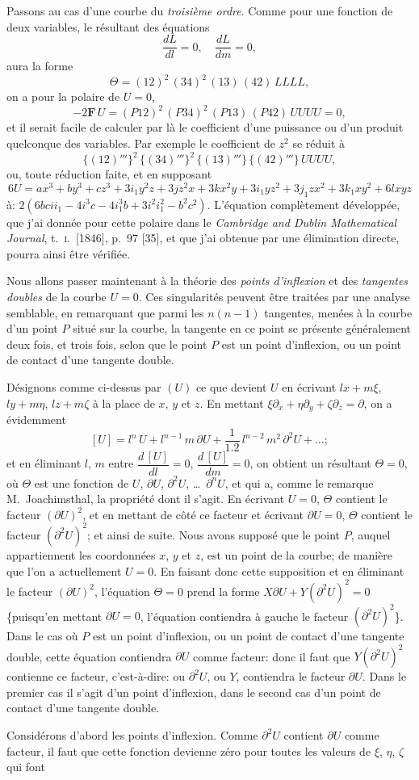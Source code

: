 \documentclass[12pt,a4paper]{article}
\theoremstyle{plain}
\begin{document}
Passons au cas d'une courbe du \textit{troisi\`eme ordre}. Comme pour une fonction de deux variables, le r\'esultant des \'equations
\[
\frac{dL}{dl} = 0, \quad \frac{dL}{dm} = 0,
\]
aura la forme
\[
\Theta = (12)^2\,(34)^2\,(13)\,(42)\, LLLL,
\]
on a pour la polaire de $U = 0$,
\[
-2\mathbf{F}\,U = (P12)^2\,(P34)^2\,(P13)\,(P42)\,UUUU = 0,
\]
et il serait facile de calculer par l\`a le coefficient d'une puissance ou d'un produit quelconque des variables. Par exemple le coefficient de $z^2$ se r\'eduit \`a
\[
\{(12)'''\}^2\,\{(34)'''\}^2\,\{(13)'''\}\,\{(42)'''\}\,UUUU,
\]
ou, toute r\'eduction faite, et en supposant
\[
6U = ax^3 + by^3 + cz^3 + 3i_1 y^2z + 3jz^2x + 3kx^2y + 3i_1 yz^2 + 3j_1 zx^2 + 3k_1 xy^2 + 6lxyz
\]
\`a: $2(6bcii_1 - 4i^3c - 4i_1^3b + 3i^2i_1^2 - b^2c^2)$. L'\'equation compl\`etement d\'evelopp\'ee, que j'ai donn\'ee pour cette polaire dans le \textit{Cambridge and Dublin Mathematical Journal}, t.~\textsc{i}.~[1846], p.~97 [35], et que j'ai obtenue par une \'elimination directe, pourra ainsi \^etre v\'erifi\'ee.

Nous allons passer maintenant \`a la th\'eorie des \textit{points d'inflexion} et des \textit{tangentes doubles} de la courbe $U = 0$. Ces singularit\'es peuvent \^etre trait\'ees par une analyse semblable, en remarquant que parmi les $n(n-1)$ tangentes, men\'ees \`a la courbe d'un point $P$ situ\'e sur la courbe, la tangente en ce point se pr\'esente g\'en\'eralement deux fois, et trois fois, selon que le point $P$ est un point d'inflexion, ou un point de contact d'une tangente double.

D\'esignons comme ci-dessus par $(U)$ ce que devient $U$ en \'ecrivant $lx + m\xi$, $ly + m\eta$, $lz + m\zeta$ \`a la place de $x$, $y$ et $z$. En mettant $\xi\partial_x + \eta\partial_y + \zeta\partial_z = \partial$, on a \'evidemment
\[
[U] = l^n\,U + l^{n-1}\,m\,\partial U + \frac{1}{1.2}\,l^{n-2}\,m^2\,\partial^2 U + \ldots;
\]
et en \'eliminant $l$, $m$ entre $\dfrac{d\,[U]}{dl} = 0$, $\dfrac{d\,[U]}{dm} = 0$, on obtient un r\'esultant $\Theta = 0$, o\`u $\Theta$ est une fonction de $U$, $\partial U$, $\partial^2 U$, \ldots\ $\partial^n U$, et qui a, comme le remarque M.~Joachimsthal, la propri\'et\'e dont il s'agit. En \'ecrivant $U = 0$, $\Theta$ contient le facteur $(\partial U)^2$, et en mettant de c\^ot\'e ce facteur et \'ecrivant $\partial U = 0$, $\Theta$ contient le facteur $(\partial^2 U)^2$; et ainsi de suite. Nous avons suppos\'e que le point $P$, auquel appartiennent les coordonn\'ees $x$, $y$ et $z$, est un point de la courbe; de mani\`ere que l'on a actuellement $U = 0$. En faisant donc cette supposition et en \'eliminant le facteur $(\partial U)^2$, l'\'equation $\Theta = 0$ prend la forme $X\partial U + Y(\partial^2 U)^2 = 0$ \{puisqu'en mettant $\partial U = 0$, l'\'equation contiendra \`a gauche le facteur $(\partial^2 U)^2$\}. Dans le cas o\`u $P$ est un point d'inflexion, ou un point de contact d'une tangente double, cette \'equation contiendra $\partial U$ comme facteur: donc il faut que $Y(\partial^2 U)^2$ contienne ce facteur, c'est-\`a-dire: ou $\partial^2 U$, ou $Y$, contiendra le facteur $\partial U$. Dans le premier cas il s'agit d'un point d'inflexion, dans le second cas d'un point de contact d'une tangente double.

Consid\'erons d'abord les points d'inflexion. Comme $\partial^2 U$ contient $\partial U$ comme facteur, il faut que cette fonction devienne z\'ero pour toutes les valeurs de $\xi$, $\eta$, $\zeta$ qui font
\end{document}
